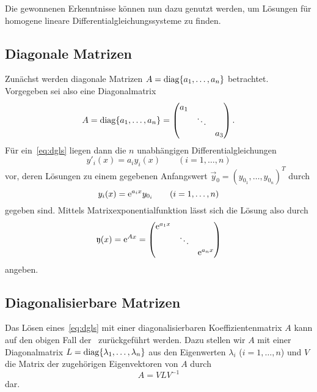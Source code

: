 Die gewonnenen Erkenntnisse können nun dazu genutzt werden, um Lösungen für homogene lineare Differentialgleichungssysteme zu finden.

\subsection{Diagonale Matrizen}\label{subsec:03-01}
Zunächst werden diagonale Matrizen $A = \operatorname{diag}\{a_1,\dots,a_n\}$ betrachtet.
Vorgegeben sei also eine Diagonalmatrix
\begin{equation*}
    A = \operatorname{diag}\{a_1,\dots,a_n\}
    = \begin{pmatrix}
          a_1 &        & \\
              & \ddots & \\
              &        & a_3
    \end{pmatrix}.
\end{equation*}
Für ein~\ref{eq:dgls} liegen dann die $n$ unabhängigen Differentialgleichungen
\begin{equation*}
    y'_i(x) = a_i y_i(x) \qquad (i = 1,\dots,n)
\end{equation*}
vor, deren Lösungen zu einem gegebenen Anfangswert $\vec{y}_0 = (y_{0_1},\dots,y_{0_n})^T$ durch
\begin{equation*}
    y_i(x) = \mathrm{e}^{a_i x} y_{0_i} \qquad (i = 1,\dots,n)
\end{equation*}
gegeben sind.
Mittels Matrixexponentialfunktion lässt sich die Lösung also durch
\begin{equation*}
    \mathfrak{y}(x) = \mathrm{e}^{Ax}
    = \begin{pmatrix}
        \mathrm{e}^{a_1 x} &        & \\
                   & \ddots & \\
                   &        & \mathrm{e}^{a_n x}
    \end{pmatrix}
\end{equation*}
angeben.

\subsection{Diagonalisierbare Matrizen}\label{subsec:03-02}
Das Lösen eines~\ref{eq:dgls} mit einer diagonalisierbaren Koeffizientenmatrix $A$ kann auf den obigen Fall der~
zurückgeführt werden.
Dazu stellen wir $A$ mit einer Diagonalmatrix $L = \operatorname{diag}\{\lambda_1,\dots,\lambda_n\}$ aus den Eigenwerten $\lambda_i$ ($i = 1,\dots,n$)
und $V$ die Matrix der zugehörigen Eigenvektoren von $A$ durch
\begin{equation*}
    A = V L V^{-1}
\end{equation*}
dar.

